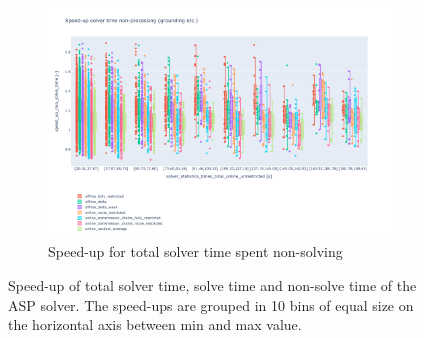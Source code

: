 \documentclass{article}
\begin{document}
\begin{figure}[hbtp]
\begin{subfigure}{\textwidth}
        \includegraphics[width=\textwidth]{Figures/04_computational_results/speed_up_non_solve_time_per_times_total_online_unrestricted.pdf}
        \caption{Speed-up for total solver time spent non-solving}
         \label{fig:computationtimes_speed_up_non_solve_time}
    \end{subfigure}
	\caption{Speed-up of total solver time, solve time and non-solve time of the ASP solver. The speed-ups are grouped in 10 bins of equal size on the horizontal axis between min and max value.}
	\label{fig:speed_up}
\end{figure}
\end{document}
